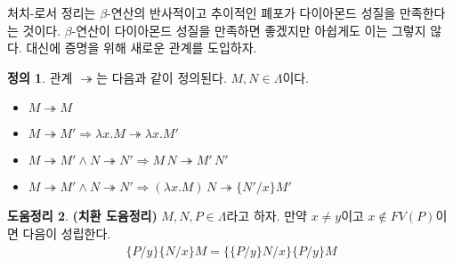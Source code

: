 \documentclass[b5paper, 11pt]{book}
\theoremstyle{definition}
\newtheorem{defn}{정의}[chapter]
\newtheorem{lem}[defn]{도움정리}
\begin{document}
처치-로서 정리는 $\beta$-연산의 반사적이고 추이적인 폐포가 다이아몬드 성질을 만족한다는 것이다.
$\beta$-연산이 다이아몬드 성질을 만족하면 좋겠지만 아쉽게도 이는 그렇지 않다. 대신에 
증명을 위해 새로운 관계를 도입하자.
\begin{defn}
    관계 $\twoheadrightarrow$는 다음과 같이 정의된다. $M,N \in \Lambda$이다.
    \begin{itemize}
        \item $M \twoheadrightarrow M $
        \item $M \twoheadrightarrow M' \Rightarrow 
        \lambda x. M \twoheadrightarrow \lambda x. M'$
        \item $M \twoheadrightarrow M' \wedge N \twoheadrightarrow N' \Rightarrow
        M \, N \twoheadrightarrow M' \, N' $
        \item $M \twoheadrightarrow M' \wedge N \twoheadrightarrow N' \Rightarrow
        (\lambda x. M)\, N \twoheadrightarrow \{N'/x\}M'$
    \end{itemize}
\end{defn}
\begin{lem}
    \textbf{(치환 도윰정리)} $M, N, P \in \Lambda$라고 하자. 만약 $x \neq y$이고 $x \notin
    FV(P)$이면 다음이 성립한다.
    \begin{align*}
        \{P / y\} \{ N / x\} M = \{ \{P / y\} N / x \} \{P / y\}  M
    \end{align*}
\end{lem}
\end{document}
